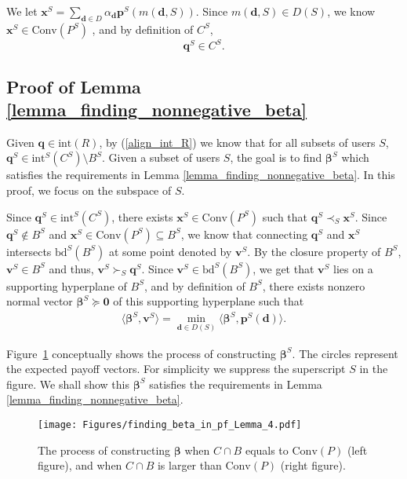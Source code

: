 \documentclass[prodmode,acmtompecs]{acmsmall}
\newcommand{\reqvec}{\mathbf{q}}
\newcommand{\succS}[1]{\succ_{#1}}
\newcommand{\precS}[1]{\prec_{#1}}
\begin{document}
We let $\mathbf{x}^S = \sum\limits_{\mathbf{d} \in D} \alpha_\mathbf{d} \mathbf{p}^S(m(\mathbf{d}, S))$. Since $m(\mathbf{d}, S) \in D(S)$, we know $\mathbf{x}^S \in \text{Conv}(P^S)$ , and by definition of $C^S$, 
$$
\reqvec^S \in C^S. 
$$

\subsection{Proof of Lemma \ref{lemma_finding_nonnegative_beta}}
\label{pf_lemma_finding_nonnegative_beta}
Given $\mathbf{q} \in \text{int}(R)$, by (\ref{align_int_R}) we know that for all subsets of users $S$, $\mathbf{q}^S \in \text{int}^S(C^S) \setminus B^S$. 
Given a subset of users $S$, the goal is to find $\boldsymbol{\beta}^S$ which satisfies the requirements in Lemma \ref{lemma_finding_nonnegative_beta}. 
In this proof, we focus on the subspace of $S$. 

Since $\mathbf{q}^S \in \text{int}^S(C^S)$, there exists $\mathbf{x}^S \in \text{Conv}(P^S)$ such that $\mathbf{q}^S \precS{S} \mathbf{x}^S$. Since $\mathbf{q}^S \notin B^S$ and $\mathbf{x}^S \in \text{Conv}(P^S) \subseteq B^S$, we know that connecting $\mathbf{q}^S$ and $\mathbf{x}^S$ intersects $\text{bd}^S(B^S)$ at some point denoted by $\mathbf{v}^S$. By the closure property of $B^S$, $\mathbf{v}^S \in B^S$ and thus, $\mathbf{v}^S \succS{S} \mathbf{q}^S$. 
Since $\mathbf{v}^S \in \text{bd}^S(B^S)$, we get that $\mathbf{v}^S$ lies on a supporting hyperplane \cite{BoV09} of $B^S$, and by definition of $B^S$, there exists nonzero normal vector $\boldsymbol{\beta}^S \succeq \mathbf{0}$ of this supporting hyperplane such that
\begin{align}
\label{align_v_is_minimum}
\langle \boldsymbol{\beta}^S, \mathbf{v}^S \rangle = \min\limits_{\mathbf{d} \in D(S)} \langle \boldsymbol{\beta}^S, \mathbf{p}^S(\mathbf{d}) \rangle. 
\end{align}

Figure~\ref{fig_finding_beta_in_pf_Lemma_4} conceptually shows the process of constructing $\boldsymbol{\beta}^S$. The circles represent the expected payoff vectors. For simplicity we suppress the superscript $S$ in the figure. 
We shall show this $\boldsymbol{\beta}^S$ satisfies the requirements in Lemma \ref{lemma_finding_nonnegative_beta}. 

\begin{figure}[htp]
  \centering
  \texttt{[image: Figures/finding\_beta\_in\_pf\_Lemma\_4.pdf]}
  \caption{The process of constructing $\boldsymbol{\beta}$ when $C\cap B$ equals to $\text{Conv}(P)$ (left figure), and when $C \cap B$ is larger than $\text{Conv}(P)$ (right figure). }
  \label{fig_finding_beta_in_pf_Lemma_4}
\end{figure}
\end{document}

